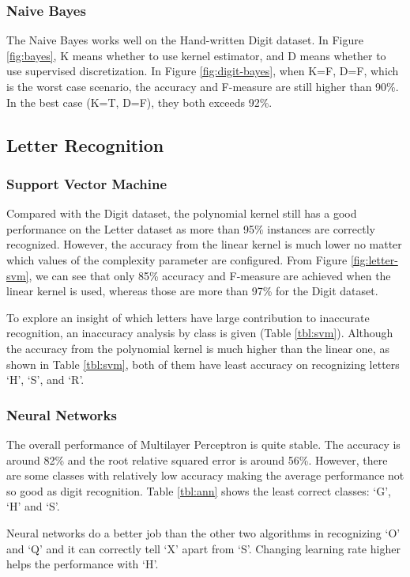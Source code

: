 \documentclass[11pt]{article}
\begin{document}
\subsubsection{Naive Bayes}
The Naive Bayes works well on the Hand-written Digit dataset. In Figure \ref{fig:bayes}, K means whether to use kernel estimator, and D means whether to use supervised discretization. In Figure \ref{fig:digit-bayes}, when K=F, D=F, which is the worst case scenario, the accuracy and F-measure are still higher than 90\%. In the best case (K=T, D=F), they both exceeds 92\%.


\subsection{Letter Recognition}
\subsubsection{Support Vector Machine}

Compared with the Digit dataset, the polynomial kernel still has a good performance on the Letter dataset as more than 95\% instances are correctly recognized. However, the accuracy from the linear kernel is much lower no matter which values of the complexity parameter are configured. From Figure \ref{fig:letter-svm}, we can see that only 85\% accuracy and F-measure are achieved when the linear kernel is used, whereas those are more than 97\% for the Digit dataset.

To explore an insight of which letters have large contribution to inaccurate recognition, an inaccuracy analysis by class is given (Table \ref{tbl:svm}). Although the accuracy from the polynomial kernel is much higher than the linear one, as shown in Table \ref{tbl:svm}, both of them have least accuracy on recognizing letters `H', `S', and `R'.


\subsubsection{Neural Networks}
The overall performance of Multilayer Perceptron is quite stable. The accuracy is around 82\% and the root relative squared error is around 56\%. However, there are some classes with relatively low accuracy making the average performance not so good as digit recognition. Table \ref{tbl:ann} shows the least correct classes: `G', `H' and `S'.

Neural networks do a better job than the other two algorithms in recognizing `O' and `Q' and it can correctly tell `X' apart from `S'. Changing learning rate higher helps the performance with `H'.
\end{document}
